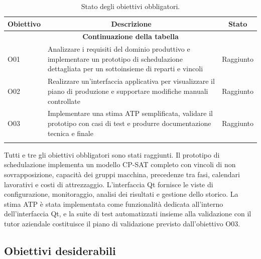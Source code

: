 \begin{center}
\begin{longtable}{|p{1.2cm}|p{8.8cm}|p{2.0cm}|}
\hline
\multicolumn{1}{|c|}{\textbf{Obiettivo}} &
\multicolumn{1}{c|}{\textbf{Descrizione}} &
\multicolumn{1}{c|}{\textbf{Stato}} \\
\hline
\endfirsthead
\hline
\multicolumn{3}{c}{{\bfseries Continuazione della tabella}}\\
\hline
\endhead

O01 & Analizzare i requisiti del dominio produttivo e implementare un prototipo di schedulazione dettagliata per un sottoinsieme di reparti e vincoli & Raggiunto \\
\hline
O02 & Realizzare un'interfaccia applicativa per visualizzare il piano di produzione e supportare modifiche manuali controllate & Raggiunto \\
\hline
O03 & Implementare una stima ATP semplificata, validare il prototipo con casi di test e produrre documentazione tecnica e finale & Raggiunto \\
\hline

\caption{Stato degli obiettivi obbligatori.}
\label{tab:obiettivi_obbligatori}
\end{longtable}
\end{center}

Tutti e tre gli obiettivi obbligatori sono stati raggiunti. Il prototipo di schedulazione implementa un modello CP-SAT completo con vincoli di non sovrapposizione, capacità dei gruppi macchina, precedenze tra fasi, calendari lavorativi e costi di attrezzaggio. L'interfaccia Qt fornisce le viste di configurazione, monitoraggio, analisi dei risultati e gestione dello storico. La stima ATP è stata implementata come funzionalità dedicata all'interno dell'interfaccia Qt, e la suite di test automatizzati insieme alla validazione con il tutor aziendale costituisce il piano di validazione previsto dall'obiettivo O03.

\subsection{Obiettivi desiderabili}

